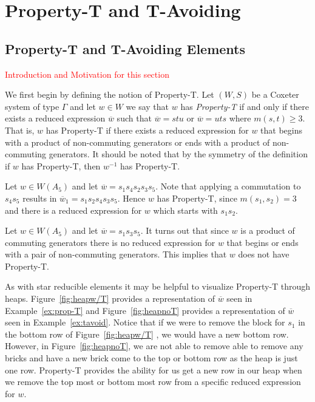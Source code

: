 \chapter{Property-T and T-Avoiding}

\section{Property-T and T-Avoiding Elements}\label{Tavoid}

\textcolor{red}{Introduction and Motivation for this section}

We first begin by defining the notion of Property-T. Let $(W,S)$ be a Coxeter system of type $\Gamma$ and let $w \in W$ we say that $w$ has \emph{Property-T} if and only if there exists a reduced expression $\overline{w}$ such that $\overline{w}=stu$ or $\overline{w}=uts$ where $m(s,t)\geq 3$. That is, $w$ has Property-T if there exists a reduced expression for $w$ that begins with a product of non-commuting generators or ends with a product of non-commuting generators. It should be noted that by the symmetry of the definition if $w$ has Property-T, then $w^{-1}$ has Property-T.

\begin{example}\label{ex:prop-T}
Let $w \in W(A_5)$ and let $\overline{w}=s_1s_4s_2s_3s_5$. Note that applying a commutation to $s_4s_5$ results in $\overline{w}_1=s_1s_2s_4s_3s_5$. Hence $w$ has Property-T, since $m(s_1,s_2)=3$ and there is a reduced expression for $w$ which starts with $s_1s_2$.	
\end{example}

\begin{example}\label{ex:tavoid}
Let $w \in W(A_5)$ and let $\overline{w}=s_1s_3s_5$. It turns out that since $w$ is a product of commuting generators there is no reduced expression for $w$ that begins or ends with a pair of non-commuting generators. This implies that $w$ does not have Property-T.	
\end{example}

As with star reducible elements it may be helpful to visualize Property-T through heaps. Figure~\ref{fig:heapw/T} provides a representation of $\overline{w}$ seen in Example~\ref{ex:prop-T} and Figure~\ref{fig:heapnoT} provides a representation of $\overline{w}$ seen in Example~\ref{ex:tavoid}. Notice that if we were to remove the block for $s_1$ in the bottom row of Figure~\ref{fig:heapw/T} , we would have a new bottom row. However, in Figure~\ref{fig:heapnoT}, we are not able to remove able to remove any bricks and have a new brick come to the top or bottom row as the heap is just one row.  Property-T provides the ability for us get a new row in our heap when we remove the top most or bottom most row from a specific reduced expression for $w$.

